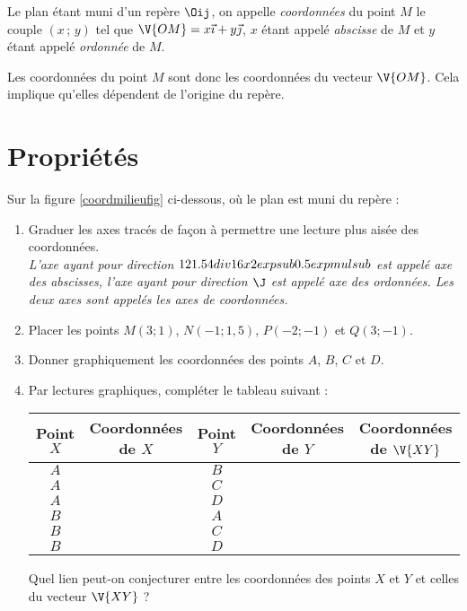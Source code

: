 \begin{definition}
 Le plan \'etant muni d'un rep\`ere $\Oij$, on appelle \emph{coordonn\'ees} du point $M$ le couple $(x\,;\,y)$ tel que $\V{OM}=x\vec{\imath}+y\vec{\jmath}$, $x$ \'etant appel\'e \emph{abscisse} de $M$ et $y$ \'etant appel\'e \emph{ordonn\'ee} de $M$.
\end{definition}

Les coordonn\'ees du point $M$ sont donc les coordonn\'ees du vecteur $\V{OM}$. Cela implique qu'elles d\'ependent de l'origine du rep\`ere.

\section{Propri\'et\'es}


\begin{act}\label{coordmilieu}
Sur la figure \ref{coordmilieufig}  ci-dessous, o\`u le plan est muni du rep\`ere \Oij :
\begin{enumerate}
	\item Graduer les axes trac\'es de fa\c{c}on \`a permettre une lecture plus ais\'ee des coordonn\'ees.\\
	\emph{L'axe ayant pour direction $12 1.5 4 div 16 x 2 exp sub 0.5 exp mul sub$ est appel\'e \emph{axe des abscisses}, l'axe ayant pour direction $\J$ est appel\'e \emph{axe des ordonn\'ees}. Les deux axes sont appel\'es les \emph{axes de coordonn\'ees}.}
	\item Placer les points $M(3;1)$, $N(-1;1,5)$, $P(-2;-1)$ et $Q(3;-1)$.	
	\item Donner graphiquement les coordonn\'ees des points $A$, $B$, $C$ et $D$.
	\item Par lectures graphiques, compl\'eter le tableau suivant :
\begin{center}
\begin{tabular}{c*{4}{|c}}
Point $X$ & Coordonn\'ees de $X$  & Point $Y$ & Coordonn\'ees de $Y$ & Coordonn\'ees de $\V{XY}$ \\
\hline
$A$ & &$B$ &  & \\
\hline
$A$ & &$C$ &  & \\
\hline
$A$ & &$D$ &  & \\
\hline
$B$ & &$A$ &  & \\
\hline
$B$ & &$C$ &  & \\
\hline
$B$ & &$D$ &  & \\
\end{tabular}
\end{center}
	Quel lien peut-on conjecturer entre les coordonn\'ees des points $X$ et $Y$ et celles du vecteur $\V{XY}$ ?
\end{enumerate}
\end{act}

